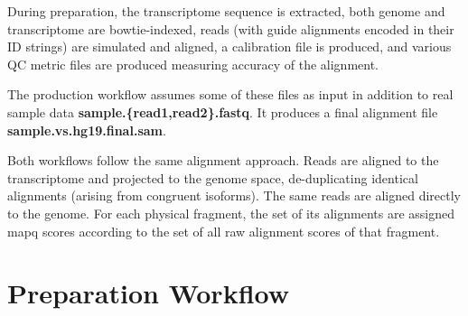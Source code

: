 \documentclass[10pt]{article}
\begin{document}
During preparation, the transcriptome sequence is extracted, both
genome and transcriptome are bowtie-indexed, reads (with guide
alignments encoded in their ID strings) are simulated and aligned, a
calibration file is produced, and various QC metric files are produced
measuring accuracy of the alignment.

The production workflow assumes some of these files as input in
addition to real sample data \textbf{sample.\{read1,read2\}.fastq}. It
produces a final alignment file \textbf{sample.vs.hg19.final.sam}.

Both workflows follow the same alignment approach.  Reads are aligned
to the transcriptome and projected to the genome space, de-duplicating
identical alignments (arising from congruent isoforms).  The same
reads are aligned directly to the genome.  For each physical fragment,
the set of its alignments are assigned mapq scores according to the
set of all raw alignment scores of that fragment.

\section{Preparation Workflow}
\end{document}
